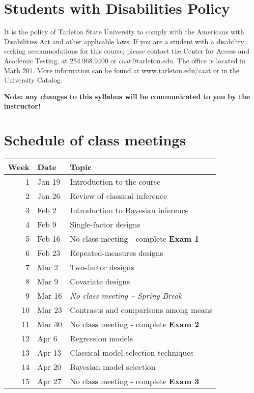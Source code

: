\documentclass[10pt]{article}
\begin{document}
\section*{Students with Disabilities Policy}
\label{sec:org7b2cfeb}

It is the policy of Tarleton State University to comply with the Americans with Disabilities Act and other applicable laws. If you are a student with a disability seeking accommodations for this course, please contact the Center for Access and Academic Testing, at 254.968.9400 or caat@tarleton.edu. The office is located in Math 201. More information can be found at www.tarleton.edu/caat or in the University Catalog.

\textbf{\textbf{Note:  any changes to this syllabus will be communicated to you by the instructor!}}

\section*{Schedule of class meetings}
\label{sec:orgc7c59b4}

\begin{center}
\begin{tabular}{rll}
Week & Date & Topic\\
\hline
1 & Jan 19 & Introduction to the course\\
2 & Jan 26 & Review of classical inference\\
3 & Feb 2 & Introduction to Bayesian inference\\
4 & Feb 9 & Single-factor designs\\
5 & Feb 16 & No class meeting - complete \textbf{Exam 1}\\
6 & Feb 23 & Repeated-measures designs\\
7 & Mar 2 & Two-factor designs\\
8 & Mar 9 & Covariate designs\\
9 & Mar 16 & \emph{No class meeting -- Spring Break}\\
10 & Mar 23 & Contrasts and comparisons among means\\
11 & Mar 30 & No class meeting - complete \textbf{Exam 2}\\
12 & Apr 6 & Regression models\\
13 & Apr 13 & Classical model selection techniques\\
14 & Apr 20 & Bayesian model selection\\
15 & Apr 27 & No class meeting - complete \textbf{Exam 3}\\
\end{tabular}
\end{center}
\end{document}
